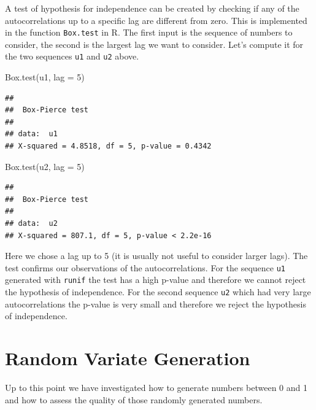 \documentclass[
]{book}
\newenvironment{Shaded}{\begin{snugshade}}{\end{snugshade}}
\newcommand{\AttributeTok}[1]{\textcolor[rgb]{0.77,0.63,0.00}{#1}}
\newcommand{\DecValTok}[1]{\textcolor[rgb]{0.00,0.00,0.81}{#1}}
\newcommand{\FunctionTok}[1]{\textcolor[rgb]{0.00,0.00,0.00}{#1}}
\newcommand{\NormalTok}[1]{#1}
\theoremstyle{definition}
\theoremstyle{definition}
\theoremstyle{definition}
\theoremstyle{definition}
\theoremstyle{remark}
\begin{document}
A test of hypothesis for independence can be created by checking if any of the autocorrelations up to a specific lag are different from zero. This is implemented in the function \texttt{Box.test} in R. The first input is the sequence of numbers to consider, the second is the largest lag we want to consider. Let's compute it for the two sequences \texttt{u1} and \texttt{u2} above.

\begin{Shaded}
\begin{Highlighting}[]
\FunctionTok{Box.test}\NormalTok{(u1, }\AttributeTok{lag =} \DecValTok{5}\NormalTok{)}
\end{Highlighting}
\end{Shaded}

\begin{verbatim}
## 
##  Box-Pierce test
## 
## data:  u1
## X-squared = 4.8518, df = 5, p-value = 0.4342
\end{verbatim}

\begin{Shaded}
\begin{Highlighting}[]
\FunctionTok{Box.test}\NormalTok{(u2, }\AttributeTok{lag =} \DecValTok{5}\NormalTok{)}
\end{Highlighting}
\end{Shaded}

\begin{verbatim}
## 
##  Box-Pierce test
## 
## data:  u2
## X-squared = 807.1, df = 5, p-value < 2.2e-16
\end{verbatim}

Here we chose a lag up to 5 (it is usually not useful to consider larger lags). The test confirms our observations of the autocorrelations. For the sequence \texttt{u1} generated with \texttt{runif} the test has a high p-value and therefore we cannot reject the hypothesis of independence. For the second sequence \texttt{u2} which had very large autocorrelations the p-value is very small and therefore we reject the hypothesis of independence.

\hypertarget{random-variate-generation}{%
\section{Random Variate Generation}\label{random-variate-generation}}

Up to this point we have investigated how to generate numbers between 0 and 1 and how to assess the quality of those randomly generated numbers.
\end{document}

